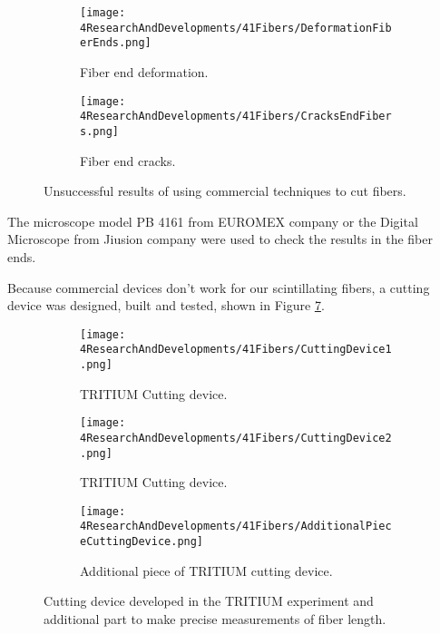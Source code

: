 \begin{figure}
\centering
    \begin{subfigure}[b]{0.5\textwidth}
    \centering
    \texttt{[image: 4ResearchAndDevelopments/41Fibers/DeformationFiberEnds.png]}  
    \caption{Fiber end deformation.\label{subfig:FiberEndDeformation}}
    \end{subfigure}
    \hfill
    \begin{subfigure}[b]{0.45\textwidth}
    \centering
    \texttt{[image: 4ResearchAndDevelopments/41Fibers/CracksEndFibers.png]}  
    \caption{Fiber end cracks.\label{subfig:FiberEndCracks}}
    \end{subfigure}
 \caption{Unsuccessful results of using commercial techniques to cut fibers.}
 \label{fig:BadCutsOfFibers}
\end{figure}

The microscope model PB 4161 from EUROMEX company or the Digital Microscope from Jiusion company were used to check the results in the fiber ends.


Because commercial devices don't work for our scintillating fibers, a cutting device was designed, built and tested, shown in Figure \ref{fig:CuttingTRITIUMDevice}.

\begin{figure}
\centering
    \begin{subfigure}[b]{0.4\textwidth}
    \centering
    \texttt{[image: 4ResearchAndDevelopments/41Fibers/CuttingDevice1.png]}  
    \caption{TRITIUM Cutting device.\label{subfig:CuttingDevice1}}
    \end{subfigure}
    \hfill
    \begin{subfigure}[b]{0.55\textwidth}
    \centering
    \texttt{[image: 4ResearchAndDevelopments/41Fibers/CuttingDevice2.png]}  
    \caption{TRITIUM Cutting device.\label{subfig:CuttingDevice2}}
    \end{subfigure}
    \hfill
    \begin{subfigure}[b]{0.6\textwidth}
    \centering
    \texttt{[image: 4ResearchAndDevelopments/41Fibers/AdditionalPieceCuttingDevice.png]}  
    \caption{Additional piece of TRITIUM cutting device.\label{subfig:AdditionalPieceCuttingDevice}}
    \end{subfigure}
 \caption{Cutting device developed in the TRITIUM experiment and additional part to make precise measurements of fiber length.}
 \label{fig:CuttingTRITIUMDevice}
\end{figure}

